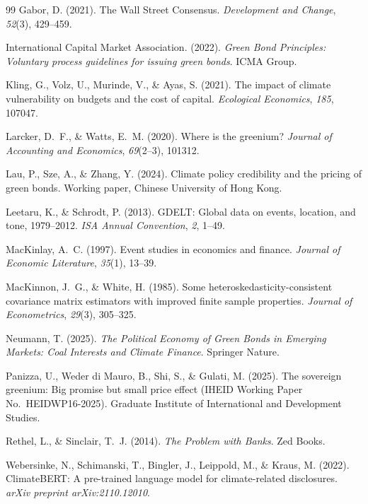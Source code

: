 \documentclass[12pt,a4paper]{article}
\begin{document}
\begin{thebibliography}{99}
Gabor, D. (2021).
The Wall Street Consensus.
\textit{Development and Change}, \textit{52}(3), 429--459.

International Capital Market Association. (2022).
\textit{Green Bond Principles: Voluntary process guidelines for issuing green bonds}.
ICMA Group.

Kling, G., Volz, U., Murinde, V., \& Ayas, S. (2021).
The impact of climate vulnerability on budgets and the cost of capital.
\textit{Ecological Economics}, \textit{185}, 107047.

Larcker, D.~F., \& Watts, E.~M. (2020).
Where is the greenium?
\textit{Journal of Accounting and Economics}, \textit{69}(2--3), 101312.

Lau, P., Sze, A., \& Zhang, Y. (2024).
Climate policy credibility and the pricing of green bonds.
Working paper, Chinese University of Hong Kong.

Leetaru, K., \& Schrodt, P. (2013).
GDELT: Global data on events, location, and tone, 1979--2012.
\textit{ISA Annual Convention}, \textit{2}, 1--49.

MacKinlay, A.~C. (1997).
Event studies in economics and finance.
\textit{Journal of Economic Literature}, \textit{35}(1), 13--39.

MacKinnon, J.~G., \& White, H. (1985).
Some heteroskedasticity-consistent covariance matrix estimators with improved finite sample properties.
\textit{Journal of Econometrics}, \textit{29}(3), 305--325.

Neumann, T. (2025).
\textit{The Political Economy of Green Bonds in Emerging Markets: Coal Interests and Climate Finance}.
Springer Nature.

Panizza, U., Weder di Mauro, B., Shi, S., \& Gulati, M. (2025).
The sovereign greenium: Big promise but small price effect
(IHEID Working Paper No.\ HEIDWP16-2025).
Graduate Institute of International and Development Studies.

Rethel, L., \& Sinclair, T.~J. (2014).
\textit{The Problem with Banks}.
Zed Books.

Webersinke, N., Schimanski, T., Bingler, J., Leippold, M., \& Kraus, M. (2022).
ClimateBERT: A pre-trained language model for climate-related disclosures.
\textit{arXiv preprint arXiv:2110.12010}.


\end{thebibliography}
\end{document}
